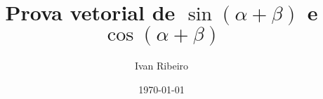 \title{Prova vetorial de $\sin(\alpha+\beta)$ e $\cos(\alpha+\beta)$}
\author{Ivan Ribeiro}
\date{\today}
\maketitle